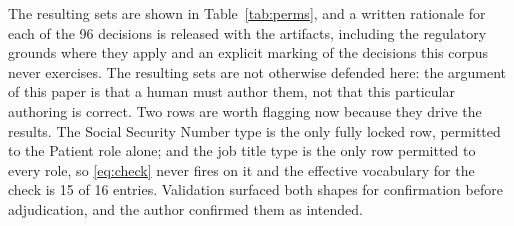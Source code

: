 \documentclass[conference]{IEEEtran}
\begin{document}
The resulting sets are shown in Table~\ref{tab:perms}, and a written rationale
for each of the 96 decisions is released with the artifacts, including the
regulatory grounds where they apply and an explicit marking of the decisions
this corpus never exercises. The resulting sets are not otherwise defended here:
the argument of this paper is that a human must author them, not that this
particular authoring is correct. Two rows are worth flagging now because they
drive the results. The Social Security Number type is
the only fully locked row, permitted to the Patient role alone; and the job title
type is the only row permitted to every role, so \eqref{eq:check} never fires on
it and the effective vocabulary for the check is 15 of 16 entries. Validation
surfaced both shapes for confirmation before adjudication, and the author
confirmed them as intended.
\end{document}
